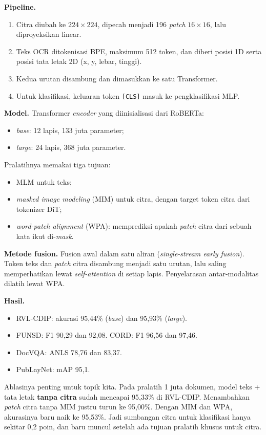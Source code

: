 \textbf{Pipeline.}
\begin{enumerate}
  \item Citra diubah ke $224\times224$, dipecah menjadi 196 \textit{patch} $16\times16$,
  lalu diproyeksikan linear.
  \item Teks OCR ditokenisasi BPE, maksimum 512 token, dan diberi posisi 1D serta posisi
  tata letak 2D (x, y, lebar, tinggi).
  \item Kedua urutan disambung dan dimasukkan ke satu Transformer.
  \item Untuk klasifikasi, keluaran token \texttt{[CLS]} masuk ke pengklasifikasi MLP.
\end{enumerate}

\textbf{Model.} Transformer \textit{encoder} yang diinisialisasi dari RoBERTa:
\begin{itemize}
  \item \textit{base}: 12 lapis, 133 juta parameter;
  \item \textit{large}: 24 lapis, 368 juta parameter.
\end{itemize}
Pralatihnya memakai tiga tujuan:
\begin{itemize}
  \item MLM untuk teks;
  \item \textit{masked image modeling} (MIM) untuk citra, dengan target token citra dari
  tokenizer DiT;
  \item \textit{word-patch alignment} (WPA): memprediksi apakah \textit{patch} citra dari
  sebuah kata ikut di-\textit{mask}.
\end{itemize}

\textbf{Metode fusion.} Fusion awal dalam satu aliran (\textit{single-stream early fusion}).
Token teks dan \textit{patch} citra disambung menjadi satu urutan, lalu saling memperhatikan
lewat \textit{self-attention} di setiap lapis. Penyelarasan antar-modalitas dilatih lewat
WPA.

\textbf{Hasil.}
\begin{itemize}
  \item RVL-CDIP: akurasi 95,44\% (\textit{base}) dan 95,93\% (\textit{large}).
  \item FUNSD: F1 90,29 dan 92,08. CORD: F1 96,56 dan 97,46.
  \item DocVQA: ANLS 78,76 dan 83,37.
  \item PubLayNet: mAP 95,1.
\end{itemize}

Ablasinya penting untuk topik kita. Pada pralatih 1 juta dokumen, model teks + tata letak
\textbf{tanpa citra} sudah mencapai 95,33\% di RVL-CDIP. Menambahkan \textit{patch} citra
tanpa MIM justru turun ke 95,00\%. Dengan MIM dan WPA, akurasinya baru naik ke 95,53\%.
Jadi sumbangan citra untuk klasifikasi hanya sekitar 0,2 poin, dan baru muncul setelah ada
tujuan pralatih khusus untuk citra.

